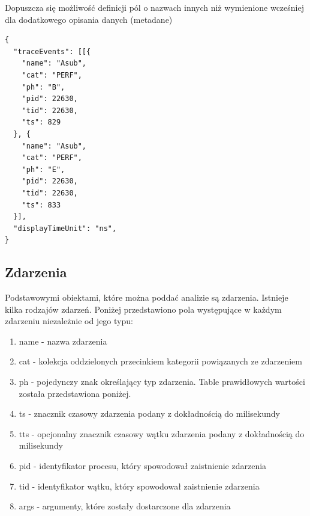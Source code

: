 \documentclass[polish, twoside, 12pt]{mwart}
\begin{document}
Dopuszcza się możliwość definicji pól o nazwach innych niż wymienione wcześniej dla dodatkowego opisania danych (metadane)

\begin{lstlisting}[caption=Przykładowy wariant obiektowy]
{
  "traceEvents": [[{
    "name": "Asub",
    "cat": "PERF",
    "ph": "B",
    "pid": 22630,
    "tid": 22630,
    "ts": 829
  }, {
    "name": "Asub",
    "cat": "PERF",
    "ph": "E",
    "pid": 22630,
    "tid": 22630,
    "ts": 833
  }],
  "displayTimeUnit": "ns",
}
\end{lstlisting}

\subsection{Zdarzenia}

Podstawowymi obiektami, które można poddać analizie są zdarzenia. Istnieje kilka rodzajów zdarzeń. Poniżej przedstawiono pola występujące w każdym zdarzeniu niezależnie od jego typu:

\begin{enumerate}
  \item name - nazwa zdarzenia
  \item cat - kolekcja oddzielonych przecinkiem kategorii powiązanych ze zdarzeniem
  \item ph - pojedynczy znak określający typ zdarzenia. Table prawidłowych wartości została przedstawiona poniżej.
  \item ts - znacznik czasowy zdarzenia podany z dokładnością do milisekundy
  \item tts - opcjonalny znacznik czasowy wątku zdarzenia podany z dokładnością do milisekundy
  \item pid - identyfikator procesu, który spowodował zaistnienie zdarzenia
  \item tid - identyfikator wątku, który spowodował zaistnienie zdarzenia
  \item args - argumenty, które zostały dostarczone dla zdarzenia
\end{enumerate}
\end{document}
